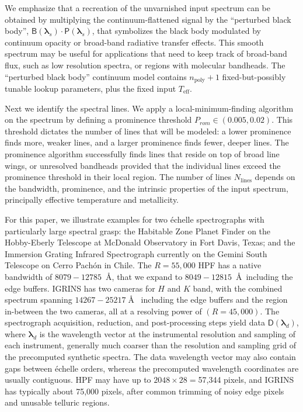 \documentclass[modern]{aastex631}
\begin{document}

We emphasize that a recreation of the unvarnished input spectrum can be obtained by multiplying the continuum-flattened signal by the ``perturbed black body'', $\mathsf{B}(\bm{\lambda}_s)\cdot \mathsf{P}(\bm{\lambda}_s)$, that symbolizes the black body modulated by continuum opacity or broad-band radiative transfer effects.  This smooth spectrum may be useful for applications that need to keep track of broad-band flux, such as low resolution spectra, or regions with molecular bandheads.  The ``perturbed black body'' continuum model contains $n_{\mathrm{poly}}+1$ fixed-but-possibly tunable lookup parameters, plus the fixed input $T_{\mathrm{eff}}$.


Next we identify the spectral lines.  We apply a local-minimum-finding algorithm on the spectrum by defining a prominence threshold $P_{rom} \in (0.005, 0.02)$.  This threshold dictates the number of lines that will be modeled: a lower prominence finds more, weaker lines, and a larger prominence finds fewer, deeper lines.  The prominence algorithm successfully finds lines that reside on top of broad line wings, or unresolved bandheads provided that the individual lines exceed the prominence threshold in their local region.  The number of lines $N_{\mathrm{lines}}$ depends on the bandwidth, prominence, and the intrinsic properties of the input spectrum, principally effective temperature and metallicity.

For this paper, we illustrate examples for two \'echelle spectrographs with particularly large spectral grasp: the Habitable Zone Planet Finder \citep[HPF,][]{2014SPIE.9147E..1GM} on the Hobby-Eberly Telescope at McDonald Observatory in Fort Davis, Texas; and the Immersion Grating Infrared Spectrograph \citep[IGRINS,][]{park14}
currently on the Gemini South Telescope on Cerro Pach\'on in Chile.  The $R=55,000$ HPF has a native bandwidth of $8079-12785$~\AA, that we expand to $8049-12815$~\AA~including the edge buffers.  IGRINS has two cameras for $H$ and $K$ band, with the combined spectrum spanning $14267-25217\;$\AA~ including the edge buffers and the region in-between the two cameras, all at a resolving power of $(R=45,000)$.  The spectrograph acquisition, reduction, and post-processing steps yield data $\mathsf{D}(\bm{\lambda}_{d})$, where $\bm{\lambda}_{d}$ is the wavelength vector at the instrumental resolution and sampling of each instrument, generally much coarser than the resolution and sampling grid of the precomputed synthetic spectra.  The data wavelength vector may also contain gaps between \'echelle orders, whereas the precomputed wavelength coordinates are usually contiguous.  HPF may have up to $2048\times28=$57,344 pixels, and IGRINS has typically about 75,000 pixels, after common trimming of noisy edge pixels and unusable telluric regions.
\end{document}
